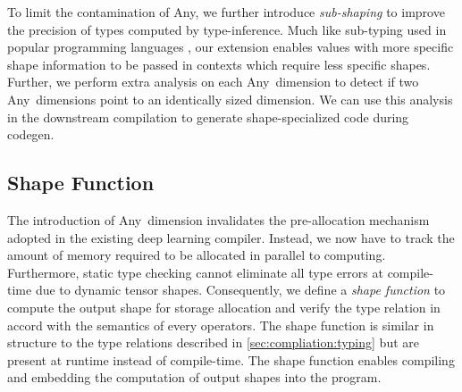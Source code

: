 To limit the contamination of Any, we further introduce {\em sub-shaping} to improve the precision of types computed by type-inference.
Much like sub-typing used in popular programming languages \citep{LiskovTPLS1994,AmadioAmadioTPLS1993}, our extension enables values with more specific shape information to be passed in contexts which require less specific shapes.
Further, we perform extra analysis on each Any~dimension to detect if two Any~dimensions point to an identically sized dimension. We can use this analysis in the downstream compilation to generate shape-specialized code during codegen.

\subsection{Shape Function}
\label{sec:compilation:shape-func}
The introduction of Any~dimension invalidates the pre-allocation mechanism adopted in the existing deep learning compiler.
Instead, we now have to track the amount of memory required to be allocated in parallel to computing.
Furthermore, static type checking cannot eliminate all type errors at compile-time due to dynamic tensor shapes.
Consequently, we define a {\em shape function} to compute the output shape for storage allocation and verify the type relation in accord with the semantics of every operators.
The shape function is similar in structure to the type relations described in \autoref{sec:compliation:typing} but are present at runtime instead of compile-time.
The shape function enables compiling and embedding the computation of output shapes into the program.

